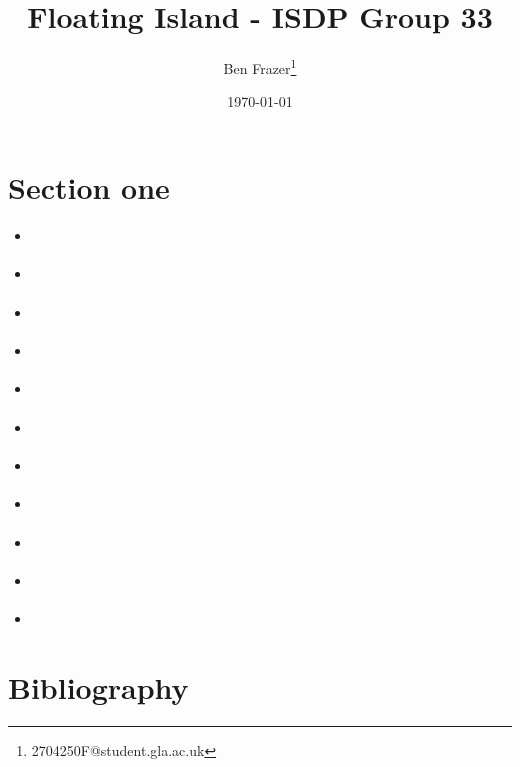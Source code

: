 \documentclass[11pt]{article}
\author{Ben Frazer\thanks{2704250F@student.gla.ac.uk}}
\date{\today}
\title{Floating Island - ISDP Group 33}
\numberwithin{equation}{section}
\begin{document}
\maketitle
\tableofcontents


\section{Section one}
\label{sec:orgc49e222}
\begin{itemize}
\item \cite{hallenbeck-2013-effec}
\item \cite{mehta-2014-ident-poten}
\item \cite{xu-2014-relat-elect}
\item \cite{xu-2014-probin-cover}
\item \cite{miller-2014-simul-temper}
\item \cite{curnan-2014-effec-concen}
\item \cite{boes-2015-estim-bulk}
\item \cite{xu-2015-linear-respon}
\item \cite{xu-2015-relat-between}
\item \cite{boes-2016-neural-networ}
\item \cite{boes-2017-neural-networ}
\end{itemize}

\section{Bibliography}
\label{sec:org30a7df8}



\end{document}
